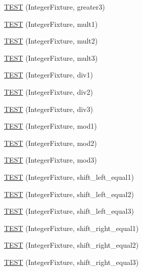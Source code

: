 \begin{DoxyCompactItemize}
\item 
\hyperlink{_test_integer_8c_09_09_a63f2ed7e8e3587850fd28be378d8a93e}{T\-E\-S\-T} (Integer\-Fixture, greater3)
\item 
\hyperlink{_test_integer_8c_09_09_a5d30a6ab911b01849840d6d47c2ade65}{T\-E\-S\-T} (Integer\-Fixture, mult1)
\item 
\hyperlink{_test_integer_8c_09_09_a6c3d51862b488434aa06e22be78e4ab6}{T\-E\-S\-T} (Integer\-Fixture, mult2)
\item 
\hyperlink{_test_integer_8c_09_09_af7570044c2a5bf577285576ffa999335}{T\-E\-S\-T} (Integer\-Fixture, mult3)
\item 
\hyperlink{_test_integer_8c_09_09_adb0d928491fb9ea9cc626a106df71593}{T\-E\-S\-T} (Integer\-Fixture, div1)
\item 
\hyperlink{_test_integer_8c_09_09_ad51a92e11e604831df276045d3302c82}{T\-E\-S\-T} (Integer\-Fixture, div2)
\item 
\hyperlink{_test_integer_8c_09_09_a3d8823c1928745620c842c34fd753c9f}{T\-E\-S\-T} (Integer\-Fixture, div3)
\item 
\hyperlink{_test_integer_8c_09_09_a5a3e5e2da8ceac800cf98ccc31190fb3}{T\-E\-S\-T} (Integer\-Fixture, mod1)
\item 
\hyperlink{_test_integer_8c_09_09_af8da24ec2c1997a271cf2132d137fa5d}{T\-E\-S\-T} (Integer\-Fixture, mod2)
\item 
\hyperlink{_test_integer_8c_09_09_a2b100215b05edf640337b4808eef0447}{T\-E\-S\-T} (Integer\-Fixture, mod3)
\item 
\hyperlink{_test_integer_8c_09_09_ac61631f702c7ea22e5bd4fa98969e9ea}{T\-E\-S\-T} (Integer\-Fixture, shift\-\_\-left\-\_\-equal1)
\item 
\hyperlink{_test_integer_8c_09_09_a5fa62bd8086b90cd8f34c9b8c323f1e6}{T\-E\-S\-T} (Integer\-Fixture, shift\-\_\-left\-\_\-equal2)
\item 
\hyperlink{_test_integer_8c_09_09_a0ac3a659eb01bc27e764ec6832d53c62}{T\-E\-S\-T} (Integer\-Fixture, shift\-\_\-left\-\_\-equal3)
\item 
\hyperlink{_test_integer_8c_09_09_a37ed42e0089ee636a2c8ce9fa3b2f65f}{T\-E\-S\-T} (Integer\-Fixture, shift\-\_\-right\-\_\-equal1)
\item 
\hyperlink{_test_integer_8c_09_09_a1ce22a70294a53e2d85b7f113710d95e}{T\-E\-S\-T} (Integer\-Fixture, shift\-\_\-right\-\_\-equal2)
\item 
\hyperlink{_test_integer_8c_09_09_aa129a03b21d6e2c23e7bf3cf254edeff}{T\-E\-S\-T} (Integer\-Fixture, shift\-\_\-right\-\_\-equal3)
\item 

\end{DoxyCompactItemize}
